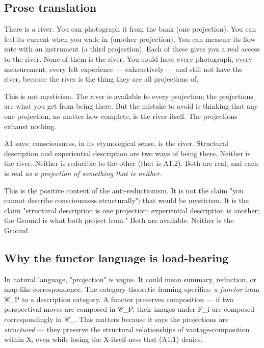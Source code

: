 \documentclass[11pt, openany]{book}
\begin{document}
\subsection{Prose translation}

There is a river. You can photograph it from the bank (one projection). You can feel its current when you wade in (another projection). You can measure its flow rate with an instrument (a third projection). Each of these gives you a real access to the river. None of them is the river. You could have every photograph, every measurement, every felt experience --- exhaustively --- and still not have the river, because the river is the thing they are all projections of.

This is not mysticism. The river is available to every projection; the projections are what you get from being there. But the mistake to avoid is thinking that any one projection, no matter how complete, is the river itself. The projections exhaust nothing.

A1 says: consciousness, in its etymological sense, is the river. Structural description and experiential description are two ways of being there. Neither is the river. Neither is reducible to the other (that is A1.2). Both are real, and each is real \textit{as a projection of something that is neither}.

This is the positive content of the anti-reductionism. It is not the claim "you cannot describe consciousness structurally"; that would be mysticism. It is the claim "structural description is one projection; experiential description is another; the Ground is what both project from." Both are available. Neither is the Ground.

\subsection{Why the functor language is load-bearing}

In natural language, "projection" is vague. It could mean summary, reduction, or map-like correspondence. The category-theoretic framing specifies: \textit{a functor} from 𝒞\_\allowbreak{}P to a description category. A functor preserves composition --- if two perspectival moves are composed in 𝒞\_\allowbreak{}P, their images under F\_\allowbreak{}i are composed correspondingly in 𝒞\_. This matters because it says the projections are \textit{structured} --- they preserve the structural relationships of vantage-composition within X, even while losing the X-itself-ness that (A1.1) denies.
\end{document}

